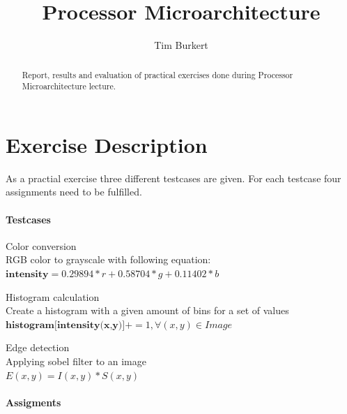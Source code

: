 \documentclass[a4paper]{scrartcl}
\begin{document}
	
	\title{Processor Microarchitecture}
	\author{Tim Burkert}
	
	\maketitle
	
	\begin{abstract}
		Report, results and evaluation of practical exercises done during Processor Microarchitecture lecture.
	\end{abstract}
	
	\section{Exercise Description}
	As a practial exercise three different testcases are given. For each testcase four assignments need to be fulfilled.
	
	\paragraph{Testcases}
	
	\begin{description}
		\item Color conversion \\
		RGB color to grayscale with following equation: \\
		$\textbf{intensity} = 0.29894*r + 0.58704*g + 0.11402*b$
		
		\item Histogram calculation \\
		Create a histogram with a given amount of bins for a set of values \\
		$\textbf{histogram[intensity(x,y)]} += 1, \forall (x,y) \in Image$
		
		\item Edge detection \\
		Applying sobel filter to an image \\
		$E(x,y) = I(x,y) * S(x,y)$
	\end{description}
	
	\paragraph{Assigments}
	
\end{document}
